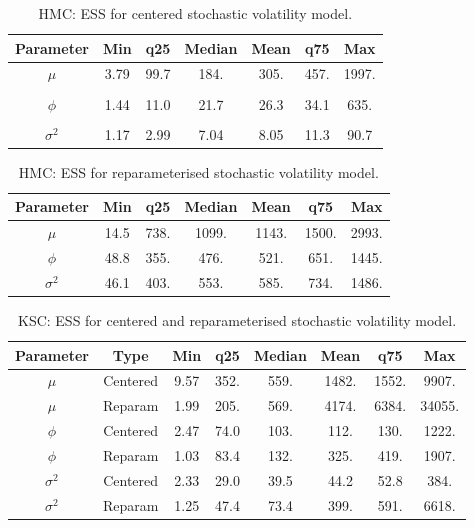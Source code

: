 \documentclass{article}
\begin{document}
\begin{table}
    \centering
    \begin{tabular}{|c|c|c|c|c|c|c|} \hline 
    Parameter & Min& q25&  Median& Mean & q75&Max\\ \hline 
    $\mu$&  3.79 & 99.7 & 184. & 305. & 457. & 1997.  \\
 & & & & & &\\\hline \hline 
 $\phi$& 1.44 & 11.0 & 21.7 & 26.3 & 34.1 & 635.  \\
 & & & & & &\\ \hline 
 $\sigma^2$ & 1.17 & 2.99 & 7.04 & 8.05 & 11.3 & 90.7 \\ \hline 
    \end{tabular}
    \caption{HMC: ESS for centered stochastic volatility model.}
    \label{tab:HMCex}
\end{table}

\begin{table}
    \centering
    \begin{tabular}{|c|c|c|c|c|c|c|} \hline 
    Parameter & Min& q25&  Median& Mean & q75&Max\\ \hline 
    $\mu$&  14.5 & 738. & 1099. & 1143. & 1500. & 2993.  \\ \hline 
 $\phi$& 48.8 & 355. & 476. & 521. & 651. & 1445.  \\ \hline 
 $\sigma^2$ & 46.1 & 403. & 553. & 585. & 734. & 1486.\\ \hline 
    \end{tabular}
    \caption{HMC: ESS for reparameterised stochastic volatility model.}
    \label{tab:HMCex}
\end{table}

\begin{table}[H]
    \centering
    \begin{tabular}{|c|c|c|c|c|c|c|c|} \hline 
    Parameter &  Type&Min& q25&  Median& Mean & q75&Max\\ \hline 
    $\mu$&  Centered&9.57 & 352. & 559. & 1482. & 1552. & 9907.\\
 $\mu$&  Reparam&1.99 & 205. & 569. & 4174. & 6384. & 34055.\\\hline 
 $\phi$&  Centered&2.47 & 74.0 & 103. & 112. & 130. & 1222.\\
 $\phi$&  Reparam&1.03 & 83.4 & 132. & 325. & 419. & 1907. \\ \hline 
 $\sigma^2$&  Centered&2.33 & 29.0 & 39.5 & 44.2 & 52.8 & 384. \\ 
 $\sigma^2$&  Reparam&1.25 & 47.4 & 73.4 & 399. & 591. & 6618. \\ \hline
    \end{tabular}
    \caption{KSC: ESS for centered and reparameterised stochastic volatility model.}
    \label{tab:hmcess}
\end{table}
\end{document}
